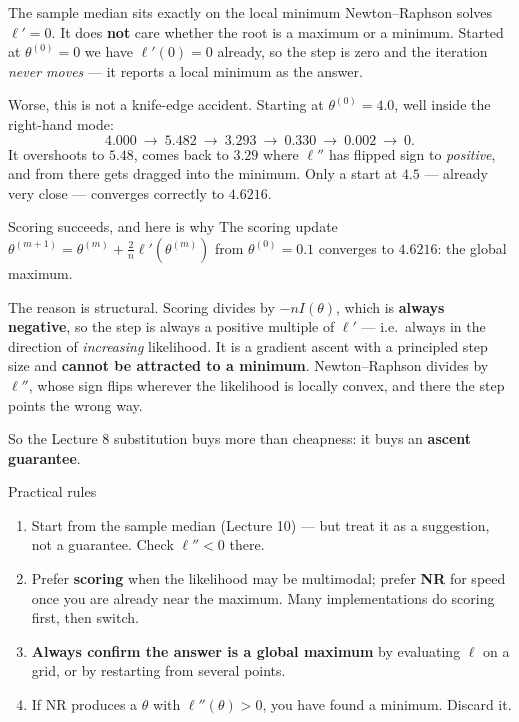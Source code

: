 \documentclass[11pt]{article}
\begin{document}
\begin{warn}{The sample median sits exactly on the local minimum}
Newton--Raphson solves $\ell'=0$. It does \textbf{not} care whether the root is a maximum or a
minimum. Started at $\theta^{(0)}=0$ we have $\ell'(0)=0$ already, so the step is zero and the
iteration \emph{never moves} --- it reports a local minimum as the answer.

Worse, this is not a knife-edge accident. Starting at $\theta^{(0)}=4.0$, well inside the
right-hand mode:
\[
4.000\ \to\ 5.482\ \to\ 3.293\ \to\ 0.330\ \to\ 0.002\ \to\ 0 .
\]
It overshoots to $5.48$, comes back to $3.29$ where $\ell''$ has flipped sign to
\emph{positive}, and from there gets dragged into the minimum. Only a start at $4.5$ ---
already very close --- converges correctly to $4.6216$.
\end{warn}

\begin{idea}{Scoring succeeds, and here is why}
The scoring update $\theta^{(m+1)}=\theta^{(m)}+\frac{2}{n}\ell'(\theta^{(m)})$ from
$\theta^{(0)}=0.1$ converges to $4.6216$: the global maximum.

The reason is structural. Scoring divides by $-nI(\theta)$, which is \textbf{always negative},
so the step is always a positive multiple of $\ell'$ --- i.e.\ always in the direction of
\emph{increasing} likelihood. It is a gradient ascent with a principled step size and
\textbf{cannot be attracted to a minimum}. Newton--Raphson divides by $\ell''$, whose sign
flips wherever the likelihood is locally convex, and there the step points the wrong way.

\smallskip
So the Lecture 8 substitution buys more than cheapness: it buys an \textbf{ascent guarantee}.
\end{idea}

\begin{recipe}{Practical rules}
\begin{enumerate}
\item Start from the sample median (Lecture 10) --- but treat it as a suggestion, not a
guarantee. Check $\ell''<0$ there.
\item Prefer \textbf{scoring} when the likelihood may be multimodal; prefer \textbf{NR} for
speed once you are already near the maximum. Many implementations do scoring first, then
switch.
\item \textbf{Always confirm the answer is a global maximum} by evaluating $\ell$ on a grid, or
by restarting from several points.
\item If NR produces a $\theta$ with $\ell''(\theta)>0$, you have found a minimum. Discard it.
\end{enumerate}
\end{recipe}
\end{document}
